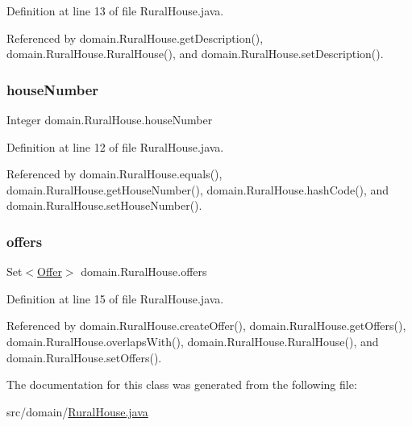Definition at line 13 of file Rural\+House.\+java.



Referenced by domain.\+Rural\+House.\+get\+Description(), domain.\+Rural\+House.\+Rural\+House(), and domain.\+Rural\+House.\+set\+Description().

\mbox{\label{classdomain_1_1RuralHouse_a1168b2c788d2f3bca3c54eee3b8734cb}} 
\subsubsection{\texorpdfstring{houseNumber}{houseNumber}}
{\footnotesize\ttfamily Integer domain.\+Rural\+House.\+house\+Number\hspace{0.3cm}{\ttfamily [private]}}



Definition at line 12 of file Rural\+House.\+java.



Referenced by domain.\+Rural\+House.\+equals(), domain.\+Rural\+House.\+get\+House\+Number(), domain.\+Rural\+House.\+hash\+Code(), and domain.\+Rural\+House.\+set\+House\+Number().

\mbox{\label{classdomain_1_1RuralHouse_ab96f0810763d7df5b3f38622850f941e}} 
\subsubsection{\texorpdfstring{offers}{offers}}
{\footnotesize\ttfamily Set$<$\mbox{\hyperlink{classdomain_1_1Offer}{Offer}}$>$ domain.\+Rural\+House.\+offers}



Definition at line 15 of file Rural\+House.\+java.



Referenced by domain.\+Rural\+House.\+create\+Offer(), domain.\+Rural\+House.\+get\+Offers(), domain.\+Rural\+House.\+overlaps\+With(), domain.\+Rural\+House.\+Rural\+House(), and domain.\+Rural\+House.\+set\+Offers().



The documentation for this class was generated from the following file\+:\begin{DoxyCompactItemize}
\item 
src/domain/\mbox{\hyperlink{RuralHouse_8java}{Rural\+House.\+java}}\end{DoxyCompactItemize}
